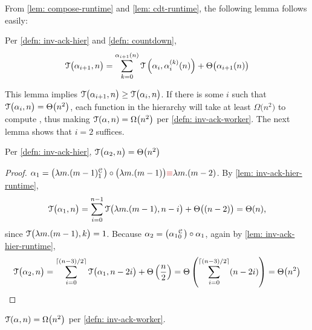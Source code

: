 From \cref{lem: compose-runtime} and \cref{lem: cdt-runtime}, the following lemma follows easily:
\begin{lem} \label{lem: inv-ack-hier-runtime}
	Per \cref{defn: inv-ack-hier} and \cref{defn: countdown},
	\begin{equation*}
	\mathcal{T}\big(\alpha_{i+1}, n\big) = \sum_{k=0}^{\alpha_{i+1}(n)}\mathcal{T}\left(\alpha_i, \alpha_i^{(k)}(n)\right) + \Theta\big(\alpha_{i+1}(n)\big)
	\end{equation*}
\end{lem}
This lemma implies $\mathcal{T}\big(\alpha_{i+1}, n\big) \ge \mathcal{T}\big(\alpha_i, n\big)$. If there is some $i$ such that $\mathcal{T}\big(\alpha_i, n\big) = \Theta\big(n^2\big)$, each function in the hierarchy will take at least $\Omega\big(n^2\big)$ to compute , thus making $\mathcal{T}(\alpha, n) = \Omega\big(n^2\big)$ per \cref{defn: inv-ack-worker}. The next lemma shows that $i = 2$ suffices.
\begin{lem}
	Per \cref{defn: inv-ack-hier}, $\mathcal{T}\big(\alpha_2, n\big) = \Theta\big(n^2\big)$
\end{lem}
\begin{proof}
	$\alpha_1 = \big(\cdt{\lambda m.(m-1)}{1}\big)\circ \big(\lambda m.(m-1)\big) {\color{red}\equiv} \lambda m.(m - 2)$. By \cref{lem: inv-ack-hier-runtime},
	\begin{equation*}
	\mathcal{T}\big(\alpha_1, n\big) = \sum_{i=0}^{n-1} \mathcal{T}\big(\lambda m.(m-1), n - i\big) + \Theta\big((n-2)\big) = \Theta(n)\text{,}
	\end{equation*}
	since $\mathcal{T}\big(\lambda m.(m-1), k\big) = 1$. Because $\alpha_2 = \big(\cdt{\alpha_1}{0}\big)\circ \alpha_1 $, again by \cref{lem: inv-ack-hier-runtime},
	\begin{equation*}
	\mathcal{T}\big(\alpha_2, n\big)
	= \sum_{i=0}^{\lceil (n-3)/2 \rceil} \mathcal{T} \big(\alpha_1, n-2i\big) + \Theta\left(\frac{n}{2}\right)
	= \Theta\left( \sum_{i=0}^{\lceil (n-3)/2 \rceil}(n - 2i) \right)
	= \Theta\big(n^2\big)
	\end{equation*}
\end{proof}
\begin{col}
	$\mathcal{T}(\alpha, n) = \Omega\big(n^2\big)$ per \cref{defn: inv-ack-worker}.
\end{col}

